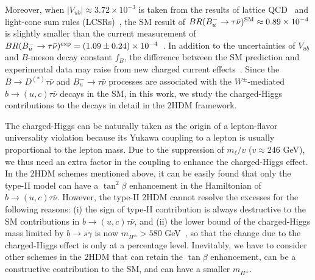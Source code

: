 \documentclass[prd,preprint,superscriptaddress,amsmath,amssymb]{revtex4}
\begin{document}
 Moreover, when $|V_{ub}|\approx 3.72\times 10^{-3}$ is taken from the results of  lattice QCD~\cite{Lattice:2015tia} and light-cone sum rules (LCSRs)~\cite{Ball:2004ye,Ball:2006jz},  the SM result of $BR(B^-_u \to \tau \bar\nu)^{\rm SM}\approx 0.89 \times 10^{-4}$ is slightly smaller than the current measurement of  $BR(B^-_u \to \tau \bar\nu)^{\rm exp}=(1.09 \pm 0.24)\times 10^{-4}$~\cite{PDG}. 
In addition to the uncertainties of $V_{ub}$ and $B$-meson decay constant $f_B$, the difference between the SM prediction and experimental data may raise from new charged current effects~\cite{Isidori:2006pk,Chen:2006nua,Akeroyd:2007eh,Akeroyd:2008ac}.  Since the $\bar B\to D^{(*)} \tau \bar\nu$ and $B^-_u \to \tau \bar\nu$ processes are associated with the $W^{\pm}$-mediated $b\to (u,c) \tau \bar \nu$ decays in the SM, in this work, we  study the charged-Higgs contributions to the decays in detail in the 2HDM  framework.

 
 The charged-Higgs can be naturally taken as the origin of a lepton-flavor universality violation because its Yukawa coupling to a lepton is usually proportional to the lepton mass.  Due to the suppression of $m_\ell/v$ ($v\approx 246$ GeV), we thus need an extra factor in the coupling to enhance the charged-Higgs effect. In the 2HDM  schemes  mentioned above, it can be easily found that only the type-II model can have a $\tan^2\beta$ enhancement in the Hamiltonian of $b\to (u,c) \tau\bar\nu$. However, the type-II 2HDM cannot resolve the excesses  for the  following reasons: (i) the sign of type-II contribution is always destructive to the SM contributions in $b\to (u, c) \tau \bar\nu$, and (ii) the lower bound of the charged-Higgs mass  limited by $b\to s \gamma$ is now $m_{H^\pm} > 580$ GeV~\cite{Misiak:2017bgg}, so that the change due to the charged-Higgs effect is only at a percentage level.  Inevitably, we have to consider other schemes in the 2HDM that can retain the $\tan\beta$ enhancement, can be a constructive contribution to the SM, and can have a smaller $m_{H^\pm}$.  
 
\end{document}
